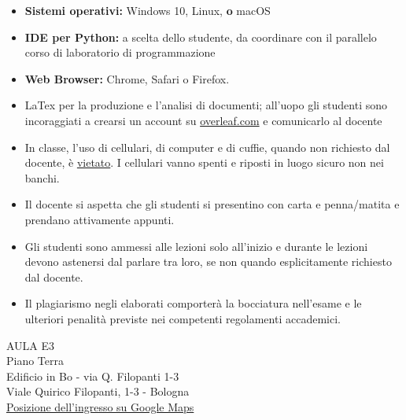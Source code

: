 \documentclass[11pt, a4paper]{article}
\begin{document}
\begin{itemize}[itemsep=2pt,parsep=0pt,topsep=2pt,partopsep=2pt]
	\item[\color{darkblue}\faLaptopCode] \textbf{Sistemi operativi:} \faWindows {} Windows  10,  \faLinux {} Linux, \textcolor{vanierred}{\textbf{o}} \faApple {} macOS 
	\item[\color{darkblue}\faCode] \textbf{IDE per Python:} \faUnity a scelta dello studente, da coordinare con il parallelo corso di laboratorio di programmazione
	\item [{\color{darkblue}\faChrome}] \textbf{Web Browser:} Chrome, Safari o Firefox.   
	\item[{\color{darkblue} \faWpforms}] LaTex per la produzione e l'analisi di documenti; all'uopo gli studenti sono incoraggiati a crearsi un account su \url{overleaf.com} e comunicarlo al docente
\end{itemize}   

\begin{itemize}[itemsep=2.5pt,parsep=0pt,topsep=8pt,partopsep=4pt]
	\item[{ \color{darkblue} \faLaptop \faMobile \faHeadphones}] In classe, l'uso di cellulari, di computer e di cuffie, quando non richiesto dal docente, \`{e}  \underline{vietato}. I cellulari vanno spenti e riposti in luogo sicuro non nei banchi.
	
	\item[{\color{darkblue} \faEdit}] Il docente si aspetta che gli studenti si presentino con carta e penna/matita e prendano attivamente appunti.
	\item[{\color{darkblue} \faRocketchat}] Gli studenti sono ammessi alle lezioni solo all'inizio e durante le lezioni devono astenersi dal parlare tra loro, se non quando esplicitamente richiesto dal docente.
	
	\item[{\color{darkred} \faThumbsDown}] Il plagiarismo negli elaborati comporter\`{a} la bocciatura nell'esame e le ulteriori penalit\`{a} previste nei competenti regolamenti accademici.
\end{itemize}


\noindent
AULA E3 \\
Piano Terra  \\
Edificio in Bo - via Q. Filopanti 1-3 \\
Viale Quirico Filopanti, 1-3 - Bologna \\
\href{https://goo.gl/maps/zXt9hYgFqeWdwXZYA}{Posizione dell'ingresso su Google Maps}\\
\end{document}
